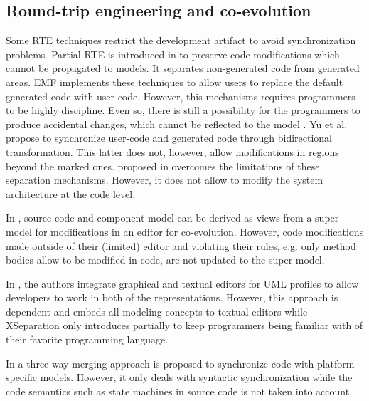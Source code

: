 \subsection{Round-trip engineering and co-evolution}
Some RTE techniques restrict the development artifact to avoid
synchronization problems.
Partial RTE is introduced in \cite{czarnecki_multi-level_2006} to preserve code modifications which cannot be propagated to models.
It separates non-generated code from generated areas. 
EMF implements these techniques to allow users to replace the default generated code with user-code.
However, this mechanisms requires programmers to be highly discipline.
Even so, there is still a possibility for the programmers to produce accidental changes, which cannot be reflected to the model \cite{zheng2012enhancing}.
Yu et al. \cite{yu2012maintaining} propose to synchronize user-code and generated code through bidirectional transformation.
This latter does not, however, allow modifications in regions beyond the marked ones. 
 proposed in \cite{zheng2012enhancing} overcomes the limitations of these separation mechanisms.
However, %
it does not allow to modify the system architecture at the code level.  




In \cite{kramer2015change}, source code and component model can be derived as views from a super model for modifications in an editor for co-evolution.
However, code modifications made outside of their (limited) editor and violating their rules, e.g. only method bodies allow to be modified in code, are not updated to the super model. 
 
In \cite{Maro:2015:IGT:2814251.2814253}, the authors integrate graphical and textual editors for UML profiles to allow developers to work in both of the representations.
However, this approach is dependent and embeds all modeling concepts to textual editors while XSeparation only introduces partially to keep programmers being familiar with of their favorite programming language.

In \cite{angyal_synchronizing_2008} a three-way merging approach is proposed to synchronize code with platform specific models.
However, it only deals with syntactic synchronization while the code semantics such as state machines in source code is not taken into account.

